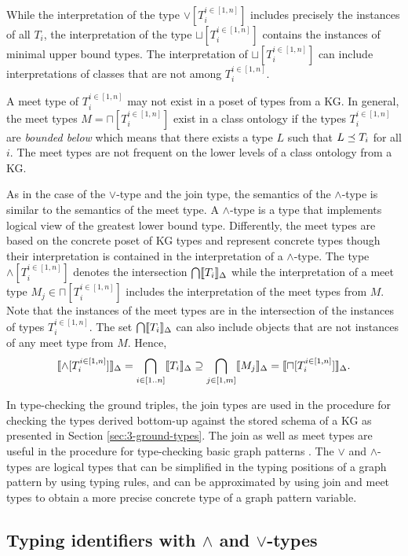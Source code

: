 \documentclass[runningheads]{llncs}
\newcommand{\llb}{\llbracket}
\newcommand{\rrb}{\rrbracket}
\begin{document}
While the interpretation of the type $\lor[T_i^{i\in[1,n]}]$ includes
precisely the instances of all $T_i$, the interpretation of the type
$\sqcup[T_i^{i\in[1,n]}]$ contains the instances of minimal upper bound
types. The interpretation of $\sqcup[T_i^{i\in[1,n]}]$ can include
interpretations of classes that are not among $T_i^{i\in[1,n]}$.

A meet type of $T_i^{i\in[1,n]}$ may not exist in a poset of types
from a KG. In general, the meet types $M=\sqcap[T_i^{i\in[1,n]}]$
exist in a class ontology if the types $T_i^{i\in[1,n]}$ are
\emph{bounded below} \cite{Pierce2002} which means that there exists a
type $L$ such that $L\preceq\/T_i$ for all $i$. The meet types are not
frequent on the lower levels of a class ontology from a KG.

As in the case of the $\lor$-type and the join type, the semantics of
the $\land$-type is similar to the semantics of the meet type. A
$\land$-type is a type that implements logical view of the greatest
lower bound type. Differently, the meet types are based on the
concrete poset of KG types and represent concrete types though their
interpretation is contained in the interpretation of a
$\land$-type. The type $\land[T_i^{i\in[1,n]}]$ denotes the
intersection $\bigcap\/\llb\/T_i\rrb_\D$ while the interpretation of a
meet type $M_j\in\sqcap[T_i^{i\in[1,n]}]$ includes the interpretation
of the meet types from $M$. Note that the instances of the meet types
are in the intersection of the instances of types
$T_i^{i\in[1,n]}$. The set $\bigcap\/\llb\/T_i\rrb_\D$ can also
include objects that are not instances of any meet type from
$M$. Hence,
$$\llb\land[T_i^{i\in[1,n]}]\rrb_\D=\bigcap_{i\in[1..n]}\/\llb\/T_i\rrb_\D\supseteq\bigcap_{j\in[1,m]}\llb\/M_j\rrb_\D=\llb\sqcap[T_i^{i\in[1,n]}]\rrb_\D.$$

In type-checking the ground triples, the join types are used in the
procedure for checking the types derived bottom-up against the stored
schema of a KG as presented in Section \ref{sec:3-ground-types}. The
join as well as meet types are useful in the procedure for
type-checking basic graph patterns \cite{Savnik2025a}. The $\lor$ and
$\land$-types are logical types that can be simplified in the typing
positions of a graph pattern by using typing rules, and can be
approximated by using join and meet types to obtain a more precise
concrete type of a graph pattern variable.




\subsection{Typing identifiers with $\land$ and $\lor$-types}
\end{document}
